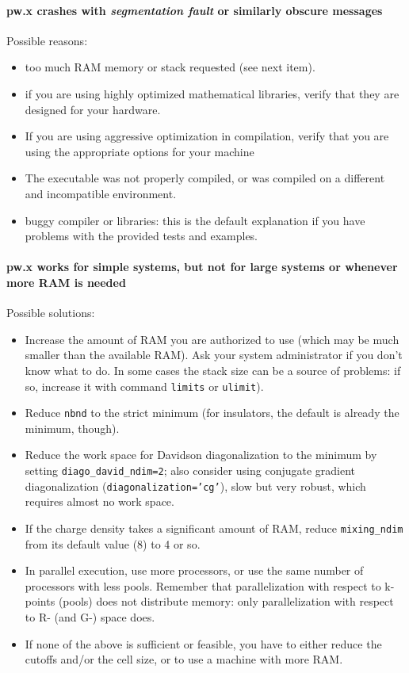 \documentclass[12pt,a4paper]{article}
\begin{document}
\paragraph{pw.x crashes with {\em segmentation fault} or similarly
  obscure messages} 
Possible reasons:
\begin{itemize}
\item  too much RAM memory or stack  requested (see next item). 
\item if you are using highly optimized mathematical libraries, verify
  that they are designed for your hardware.
\item If you are using aggressive optimization in compilation, verify
that you are using the appropriate options for your machine
\item The executable was not properly compiled, or was compiled on
a different and incompatible environment.
\item buggy compiler or libraries: this is the default explanation if you
have problems with the provided tests and examples.
\end{itemize}

\paragraph{pw.x works for simple systems, but not for large systems
  or whenever more RAM is needed}  
Possible solutions:
\begin{itemize}
\item Increase the amount of RAM you are authorized to use (which may
  be much smaller than the available RAM). Ask your system
  administrator if you don't know what to do. In some cases the 
  stack size can be a source of problems: if so, increase it with command 
  \texttt{limits} or \texttt{ulimit}).
\item Reduce \texttt{nbnd} to the strict minimum (for insulators, the
default is already the minimum, though).
\item Reduce the work space for Davidson diagonalization to the minimum
 by setting \texttt{diago\_david\_ndim=2}; also consider using conjugate
 gradient diagonalization (\texttt{diagonalization='cg'}), slow but very 
 robust, which requires almost no work space.
\item If the charge density takes a significant amount of RAM, reduce 
 \texttt{mixing\_ndim} from its default value (8) to 4 or so.
\item In parallel execution, use more processors, or use the same
  number of processors with less pools. Remember that parallelization
  with respect to k-points (pools) does not distribute memory:
  only parallelization with respect to R- (and G-) space does. 
\item If none of the above is sufficient or feasible, you have to either
  reduce the cutoffs and/or the cell size, or to use a machine with 
  more RAM.
\end{itemize}
\end{document}
